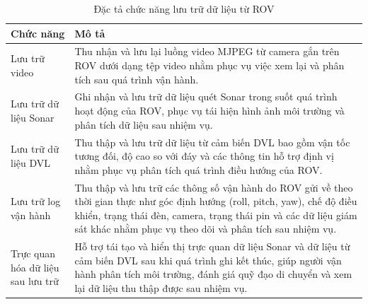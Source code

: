 \documentclass[../DoAn.tex]{subfiles}
\begin{document}
\begin{table}[H]

\centering

\renewcommand{\arraystretch}{1.3}

\begin{tabular}{|l|p{9cm}|}

\hline

\textbf{Chức năng} & \textbf{Mô tả} \\

\hline

Lưu trữ video &
Thu nhận và lưu lại luồng video MJPEG từ camera gắn trên ROV
dưới dạng tệp video nhằm phục vụ việc xem lại và phân tích
sau quá trình vận hành. \\

\hline

Lưu trữ dữ liệu Sonar &
Ghi nhận và lưu trữ dữ liệu quét Sonar trong suốt quá trình hoạt động
của ROV, phục vụ tái hiện hình ảnh môi trường và phân tích dữ liệu
sau nhiệm vụ. \\

\hline

Lưu trữ dữ liệu DVL &
Thu thập và lưu trữ dữ liệu từ cảm biến DVL bao gồm vận tốc tương đối,
độ cao so với đáy và các thông tin hỗ trợ định vị nhằm phục vụ
phân tích quá trình điều hướng của ROV. \\

\hline

Lưu trữ log vận hành &
Thu thập và lưu trữ các thông số vận hành do ROV gửi về theo
thời gian thực như góc định hướng (roll, pitch, yaw), chế độ điều khiển,
trạng thái đèn, camera, trạng thái pin và các dữ liệu giám sát khác
nhằm phục vụ theo dõi và phân tích sau nhiệm vụ. \\

\hline

Trực quan hóa dữ liệu sau lưu trữ &
Hỗ trợ tái tạo và hiển thị trực quan dữ liệu Sonar và dữ liệu từ cảm biến
DVL sau khi quá trình ghi kết thúc, giúp người vận hành phân tích môi trường,
đánh giá quỹ đạo di chuyển và xem lại dữ liệu thu thập được sau nhiệm vụ. \\

\hline

\end{tabular}

\caption{Đặc tả chức năng lưu trữ dữ liệu từ ROV}

\label{tab:rov_storage}

\end{table}
\end{document}
